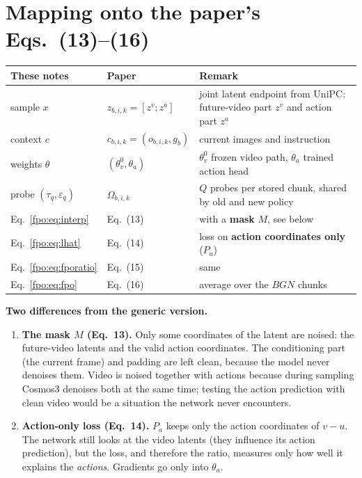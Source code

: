 \section{Mapping onto the paper's Eqs.~(13)--(16)}\label{fpo:sec:paper}
\begin{center}
\small
\begin{tabularx}{\linewidth}{@{}l l Y@{}}
\toprule
These notes & Paper & Remark\\
\midrule
sample $x$ & $z_{b,i,k}=[z^v;z^a]$ & joint latent endpoint from UniPC: future-video part $z^v$ and action part $z^a$\\
context $c$ & $c_{b,i,k}=(o_{b,i,k},g_b)$ & current images and instruction\\
weights $\theta$ & $(\theta_v^0,\theta_a)$ & $\theta_v^0$ frozen video path, $\theta_a$ trained action head\\
probe $(\tau_q,\varepsilon_q)$ & $\Omega_{b,i,k}$ & $Q$ probes per stored chunk, shared by old and new policy\\
Eq.~\eqref{fpo:eq:interp} & Eq.~(13) & with a \textbf{mask} $M$, see below\\
Eq.~\eqref{fpo:eq:lhat} & Eq.~(14) & loss on \textbf{action coordinates only} ($P_a$)\\
Eq.~\eqref{fpo:eq:fporatio} & Eq.~(15) & same\\
Eq.~\eqref{fpo:eq:fpo} & Eq.~(16) & average over the $BGN$ chunks\\
\bottomrule
\end{tabularx}
\end{center}

\textbf{Two differences from the generic version.}
\begin{enumerate}
\item \textbf{The mask $M$ (Eq.~13).} Only some coordinates of the latent are noised: the future-video latents and the valid action coordinates. The conditioning part (the current frame) and padding are left clean, because the model never denoises them. Video is noised together with actions because during sampling Cosmos3 denoises both at the same time; testing the action prediction with clean video would be a situation the network never encounters.
\item \textbf{Action-only loss (Eq.~14).} $P_a$ keeps only the action coordinates of $v-u$. The network still looks at the video latents (they influence its action prediction), but the loss, and therefore the ratio, measures only how well it explains the \emph{actions}. Gradients go only into $\theta_a$.
\end{enumerate}

